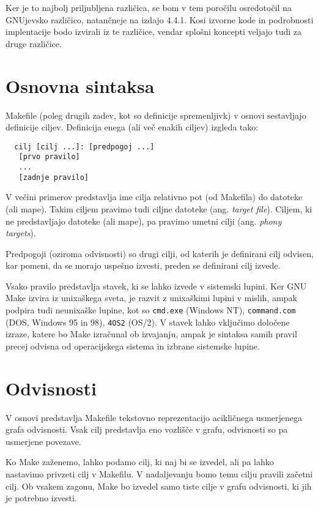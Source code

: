 \documentclass[notitlepage]{report}
\begin{document}
Ker je to najbolj priljubljena različica, se bom v tem poročilu
osredotočil na GNUjevsko različico, natančneje na izdajo 4.4.1. Kosi
izvorne kode in podrobnosti implentacije bodo izvirali iz te
različice, vendar splošni koncepti veljajo tudi za druge različice.

\section*{Osnovna sintaksa}

Makefile (poleg drugih zadev, kot so definicije spremenljivk) v osnovi
sestavljajo definicije ciljev. Definicija enega (ali več enakih
ciljev) izgleda tako:

\begin{verbatim}
  cilj [cilj ...]: [predpogoj ...]
   [prvo pravilo]
   ...
   [zadnje pravilo]
\end{verbatim}

V večini primerov predstavlja ime cilja relativno pot (od Makefila)
do datoteke (ali mape). Takim ciljem pravimo tudi ciljne datoteke
(ang. \textit{target file}). Ciljem, ki ne predstavljajo datoteke (ali
mape), pa pravimo umetni cilji (ang. \textit{phony targets}).

Predpogoji (oziroma odvisnosti) so drugi cilji, od katerih je
definirani cilj odvisen, kar pomeni, da se morajo uspešno izvesti,
preden se definirani cilj izvede.

Vsako pravilo predstavlja stavek, ki se lahko izvede v sistemski
lupini. Ker GNU Make izvira iz unixaškega sveta, je razvit z
unixaškimi lupini v mislih, ampak podpira tudi neunixaške lupine, kot
so \verb|cmd.exe| (Windows NT), \verb|command.com| (DOS, Windows 95 in
98), \verb|4OS2| (OS/2). V stavek lahko vključimo določene izraze,
katere bo Make izračunal ob izvajanju, ampak je sintaksa samih pravil
precej odvisna od operacijskega sistema in izbrane sistemske lupine.

\section*{Odvisnosti}

V osnovi predstavlja Makefile tekstovno reprezentacijo acikličnega
usmerjenega grafa odvisnosti. Vsak cilj predstavlja eno vozlišče v
grafu, odvisnosti so pa usmerjene povezave.

Ko Make zaženemo, lahko podamo cilj, ki naj bi se izvedel, ali pa
lahko nastavimo privzeti cilj v Makefilu. V nadaljevanju bomo temu
cilju pravili začetni cilj. Ob vsakem zagonu, Make bo izvedel samo
tiste cilje v grafu odvisnosti, ki jih je potrebno izvesti.
\end{document}
